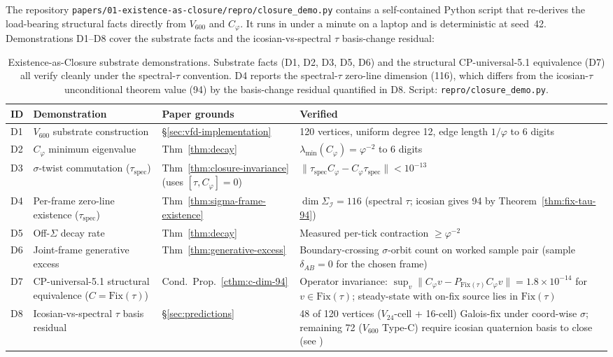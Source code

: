 \documentclass[11pt]{article}
\theoremstyle{plain}
\theoremstyle{definition}
\theoremstyle{remark}
\newcommand{\Ical}{\mathcal{I}}
\newcommand{\Fix}{\mathrm{Fix}}
\newcommand{\Cph}{C_\varphi}
\begin{document}
The repository \texttt{papers/01-existence-as-closure/repro/closure\_demo.py} contains a self-contained Python script that re-derives the load-bearing structural facts directly from $V_{600}$ and $\Cph$. It runs in under a minute on a laptop and is deterministic at seed~42. Demonstrations D1--D8 cover the substrate facts and the icosian-vs-spectral $\tau$ basis-change residual:

\begin{table}[h]
\centering
\small
\caption{Existence-as-Closure substrate demonstrations. Substrate facts (D1, D2, D3, D5, D6) and the structural CP-universal-5.1 equivalence (D7) all verify cleanly under the spectral-$\tau$ convention. D4 reports the spectral-$\tau$ zero-line dimension (116), which differs from the icosian-$\tau$ unconditional theorem value (94) by the basis-change residual quantified in D8. Script: \texttt{repro/closure\_demo.py}.}\label{tab:existence-numerical-demos}
\begin{tabular}{p{0.6cm}p{3.6cm}p{3.4cm}p{5.6cm}}
\toprule
ID & Demonstration & Paper grounds & Verified \\
\midrule
D1 & $V_{600}$ substrate construction & \S\ref{sec:vfd-implementation} & 120 vertices, uniform degree 12, edge length $1/\varphi$ to 6 digits \\
D2 & $\Cph$ minimum eigenvalue & Thm~\ref{thm:decay} & $\lambda_{\min}(\Cph) = \varphi^{-2}$ to 6 digits \\
D3 & $\sigma$-twist commutation ($\tau_{\mathrm{spec}}$) & Thm~\ref{thm:closure-invariance} (uses $[\tau, \Cph] = 0$) & $\|\tau_{\mathrm{spec}} \Cph - \Cph \tau_{\mathrm{spec}}\| < 10^{-13}$ \\
D4 & Per-frame zero-line existence ($\tau_{\mathrm{spec}}$) & Thm~\ref{thm:sigma-frame-existence} & $\dim \Sigma_\Ical = 116$ (spectral $\tau$; icosian gives 94 by Theorem~\ref{thm:fix-tau-94}) \\
D5 & Off-$\Sigma$ decay rate & Thm~\ref{thm:decay} & Measured per-tick contraction $\geq \varphi^{-2}$ \\
D6 & Joint-frame generative excess & Thm~\ref{thm:generative-excess} & Boundary-crossing $\sigma$-orbit count on worked sample pair (sample $\delta_{AB} = 0$ for the chosen frame) \\
D7 & CP-universal-5.1 structural equivalence ($C = \Fix(\tau)$) & Cond.~Prop.~\ref{cthm:c-dim-94} & Operator invariance: $\sup_v \|\Cph v - P_{\Fix(\tau)} \Cph v\| = 1.8\!\times\!10^{-14}$ for $v \in \Fix(\tau)$; steady-state with on-fix source lies in $\Fix(\tau)$ \\
D8 & Icosian-vs-spectral $\tau$ basis residual & \S\ref{sec:predictions} & 48 of 120 vertices ($V_{24}$-cell + 16-cell) Galois-fix under coord-wise $\sigma$; remaining 72 ($V_{600}$ Type-C) require icosian quaternion basis to close (see \citet{PerObserverZeroLine}) \\
\bottomrule
\end{tabular}
\end{table}
\end{document}

